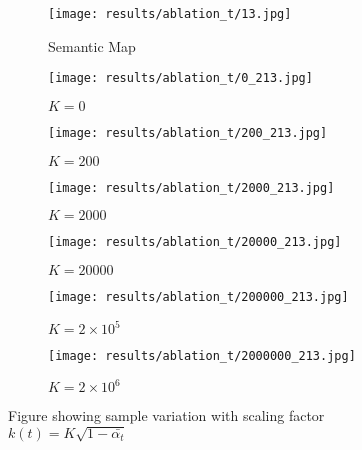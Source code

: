 
  \begin{figure*}[t!]
    \centering
        \begin{subfigure}[t]{0.130\linewidth}
      \captionsetup{justification=centering, labelformat=empty, font=scriptsize}
      \texttt{[image: results/ablation\_t/13.jpg]}
      \caption{Semantic Map}
    \end{subfigure}
    \begin{subfigure}[t]{0.130\linewidth}
      \captionsetup{justification=centering, labelformat=empty, font=scriptsize}
      \texttt{[image: results/ablation\_t/0\_213.jpg]}
      \caption{$K=0$}
    \end{subfigure}
    \begin{subfigure}[t]{0.130\linewidth}
      \captionsetup{justification=centering, labelformat=empty, font=scriptsize}
      \texttt{[image: results/ablation\_t/200\_213.jpg]}
      \caption{$K=200$}
    \end{subfigure}
    \begin{subfigure}[t]{0.130\linewidth}
      \captionsetup{justification=centering, labelformat=empty, font=scriptsize}
      \texttt{[image: results/ablation\_t/2000\_213.jpg]}
      \caption{$K=2000$}
    \end{subfigure}
        \begin{subfigure}[t]{0.130\linewidth}
      \captionsetup{justification=centering, labelformat=empty, font=scriptsize}
      \texttt{[image: results/ablation\_t/20000\_213.jpg]}
      \caption{$K=20000$}
    \end{subfigure}
       \begin{subfigure}[t]{0.130\linewidth}
      \captionsetup{justification=centering, labelformat=empty, font=scriptsize}
      \texttt{[image: results/ablation\_t/200000\_213.jpg]}
    \caption{$K=2\times10^5$}    
    \end{subfigure}
        \begin{subfigure}[t]{0.130\linewidth}
      \captionsetup{justification=centering, labelformat=empty, font=scriptsize}
      \texttt{[image: results/ablation\_t/2000000\_213.jpg]}
    \caption{$K=2\times10^6$}    
    \end{subfigure}   
    \vspace{-3mm}    \caption{Figure showing sample variation with scaling factor $k(t) = K\sqrt{1-\bar{\alpha_t}}$}
    \label{fig:ablation}
    \vspace{-5mm}
  \end{figure*}


